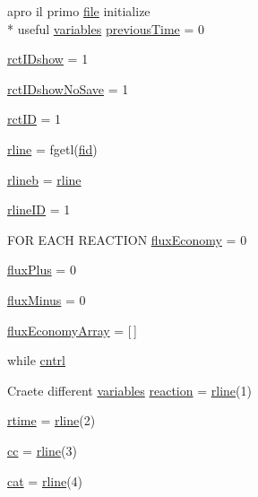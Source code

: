 \begin{DoxyCompactItemize}
\item 
apro il primo \hyperlink{a00110_a4e8353d6c62cf54bf4a1a8f63e56b8c3}{file} initialize \\*
useful \hyperlink{a00037_a075795b83d470ba58980e465541f16e9}{variables} \hyperlink{a00028_a17b8652a085b5add031a40fb1c9a680e}{previous\+Time} = 0
\item 
\hyperlink{a00028_acfa9ac92c0e448faa531767d0e6ab194}{rct\+I\+Dshow} = 1
\item 
\hyperlink{a00028_aeb449dcc9eb8bfe0321b031e10962ac5}{rct\+I\+Dshow\+No\+Save} = 1
\item 
\hyperlink{a00028_acdd7317ca799b220a16028dcd54617a1}{rct\+I\+D} = 1
\item 
\hyperlink{a00028_a81318310a01613185f6a3e6183230bd0}{rline} = fgetl(\hyperlink{a00031_ae9011d40c6f13e68e6f07156e0da7c5d}{fid})
\item 
\hyperlink{a00028_a8df79027fd85d4a3668754f36e9e88c1}{rlineb} = \hyperlink{a00028_ab5b947e1a8b7cf496ffd4eb21317052e}{rline}
\item 
\hyperlink{a00028_a8443a49765859a8631fed7e8a1d27fe5}{rline\+I\+D} = 1
\item 
F\+O\+R E\+A\+C\+H R\+E\+A\+C\+T\+I\+O\+N \hyperlink{a00028_a8acf89849d5ed6a553d46d0e413773c5}{flux\+Economy} = 0
\item 
\hyperlink{a00028_a8fc578e8d997ae0f0e3063de3566646d}{flux\+Plus} = 0
\item 
\hyperlink{a00028_a3fea311ae703b9842f1429a370657f90}{flux\+Minus} = 0
\item 
\hyperlink{a00028_a5d3cba9db002e77eaf6ffce66592841f}{flux\+Economy\+Array} = \mbox{[}$\,$\mbox{]}
\item 
while \hyperlink{a00028_aae7c98255a05b6029bdfc5e96dc2ab88}{cntrl}
\item 
Craete different \hyperlink{a00037_a075795b83d470ba58980e465541f16e9}{variables} \hyperlink{a00028_a4ba2ecb46f808729569ecce2cc1d34c6}{reaction} = \hyperlink{a00028_ab5b947e1a8b7cf496ffd4eb21317052e}{rline}(1)
\item 
\hyperlink{a00028_afc6b38657a313b9f1de2ee356910b6ee}{rtime} = \hyperlink{a00028_ab5b947e1a8b7cf496ffd4eb21317052e}{rline}(2)
\item 
\hyperlink{a00028_afb5980388a6e55ca55437b53cdaf528a}{cc} = \hyperlink{a00028_ab5b947e1a8b7cf496ffd4eb21317052e}{rline}(3)
\item 
\hyperlink{a00028_a7073f71a43389f3032e69b1fffc2551a}{cat} = \hyperlink{a00028_ab5b947e1a8b7cf496ffd4eb21317052e}{rline}(4)
\item 

\end{DoxyCompactItemize}
